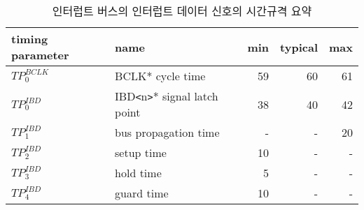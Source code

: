 %
%
\begin{table}[htbp]
\caption{인터럽트 버스의 인터럽트 데이터 신호의 시간규격 요약}\label{table:ibd-time}
   \begin{center}
   \begin{tabular}{|l|l|r|r|r|} \hline
	timing parameter & name & min & typical & max \\ \hline \hline
	$TP^{BCLK}_0$ & BCLK* cycle time & 59 & 60 & 61 \\ \hline
	$TP^{IBD}_0$  & IBD{\tt <}n{\tt >}* signal latch point & 38 & 40 & 42 \\ \hline
	$TP^{IBD}_1$  & bus propagation time & - & - & 20 \\ \hline
	$TP^{IBD}_2$  & setup time & 10 & - & - \\ \hline
	$TP^{IBD}_3$  & hold time & 5 & - & - \\ \hline
	$TP^{IBD}_4$  & guard time & 10 & - & - \\ \hline
   \end{tabular}
   \end{center}
\end{table}
%
%
